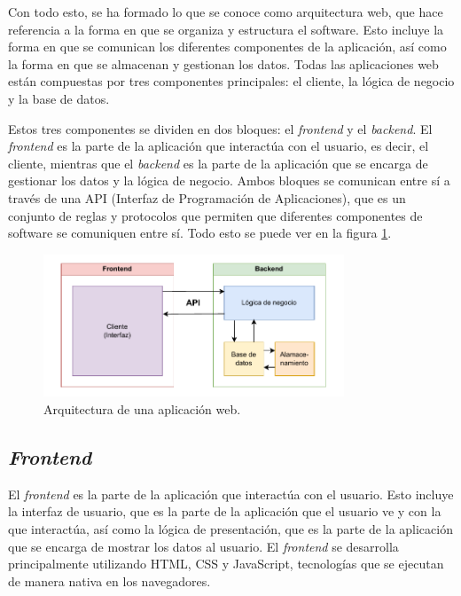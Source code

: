 Con todo esto, se ha formado lo que se conoce como arquitectura web, que hace referencia a la forma en que se organiza y estructura el software. Esto incluye la forma en que se comunican los diferentes componentes de la aplicación, así como la forma en que se almacenan y gestionan los datos. Todas las aplicaciones web están compuestas por tres componentes principales: el cliente, la lógica de negocio y la base de datos.

Estos tres componentes se dividen en dos bloques: el \textit{frontend} y el \textit{backend}. El \textit{frontend} es la parte de la aplicación que interactúa con el usuario, es decir, el cliente, mientras que el \textit{backend} es la parte de la aplicación que se encarga de gestionar los datos y la lógica de negocio. Ambos bloques se comunican entre sí a través de una API (Interfaz de Programación de Aplicaciones), que es un conjunto de reglas y protocolos que permiten que diferentes componentes de software se comuniquen entre sí. Todo esto se puede ver en la figura \ref{fig:arquitectura_web}.

\begin{figure}
    \centering
    \includegraphics[width=0.8\textwidth]{figures/theoric_frame/arquitectura_web.pdf}
    \caption{Arquitectura de una aplicación web.}
    \label{fig:arquitectura_web}
\end{figure}

\subsection{\textit{Frontend}}
\label{mt:subsec:frontend}

El \textit{frontend} es la parte de la aplicación que interactúa con el usuario. Esto incluye la interfaz de usuario, que es la parte de la aplicación que el usuario ve y con la que interactúa, así como la lógica de presentación, que es la parte de la aplicación que se encarga de mostrar los datos al usuario. El \textit{frontend} se desarrolla principalmente utilizando HTML, CSS y JavaScript, tecnologías que se ejecutan de manera nativa en los navegadores.

